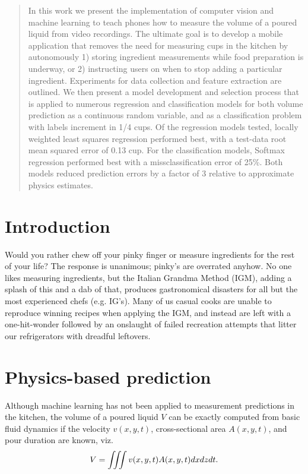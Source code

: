 \documentclass[twocolumn,10pt]{article}
\begin{document}

\begin{abstract}
In this work we present the implementation of computer vision and machine learning to teach phones how to measure the volume of a poured liquid from video recordings. The ultimate goal is to develop a mobile application that removes the need for measuring cups in the kitchen by autonomously 1) storing ingredient measurements while food preparation is underway, or 2) instructing users on when to stop adding a particular ingredient. Experiments for data collection and feature extraction are outlined. We then present a model development and selection process that is applied to numerous regression and classification models for both volume prediction as a continuous random variable, and as a classification problem with labels increment in 1/4 cups. Of the regression models tested, locally weighted least squares regression performed best, with a test-data root mean squared error of 0.13 cup. For the classification models, Softmax regression performed best with a missclassification error of 25\%. Both models reduced prediction errors by a factor of 3 relative to approximate physics estimates.        
\end{abstract}

\section{Introduction}
Would you rather chew off your pinky finger or measure ingredients for the rest of your life? The response is unanimous; pinky's are overrated anyhow. No one likes measuring ingredients, but the Italian Grandma Method (IGM), adding a splash of this and a dab of that, produces gastronomical disasters for all but the most experienced chefs (e.g. IG’s). Many of us casual cooks are unable to reproduce winning recipes when applying the IGM, and instead are left with a one-hit-wonder followed by an onslaught of failed recreation attempts that litter our refrigerators with dreadful leftovers.


\section{Physics-based prediction}
Although machine learning has not been applied to measurement predictions in the kitchen, the volume of a poured liquid $V$ can be exactly computed from basic fluid dynamics if the velocity $v(x,y,t)$, cross-sectional area $A(x,y,t)$, and pour duration are known, viz. 
\begin{equation} \label{eq:1}
V = \iiint v(x,y,t) A(x,y,t) dx dz dt \\.
\end{equation}
\end{document}
